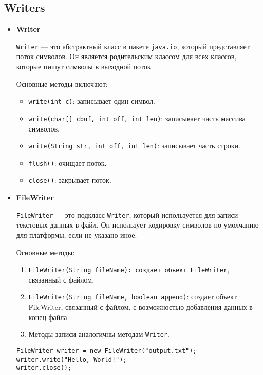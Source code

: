 \subsection{Writers}
\begin{itemize}
    \item \textbf{Writer} \par
    \texttt{Writer} — это абстрактный класс в пакете \texttt{java.io}, который представляет поток символов. Он является родительским классом для всех классов, которые пишут символы в выходной поток. \par
    Основные методы включают:
    \begin{itemize}
        
    \item \texttt{write(int c)}: записывает один символ.
    \item \texttt{write(char[] cbuf, int off, int len)}: записывает часть массива символов.
    \item \texttt{write(String str, int off, int len)}: записывает часть строки.
    \item \texttt{flush()}: очищает поток.
    \item \texttt{close()}: закрывает поток.
    \end{itemize}


    \item \textbf{FileWriter} \par
    \texttt{FileWriter} — это подкласс \texttt{Writer}, который используется для записи текстовых данных в файл. Он использует кодировку символов по умолчанию для платформы, если не указано иное. \par
    Основные методы:
    \begin{enumerate}
        \item \texttt{FileWriter(String fileName): создает объект FileWriter}, связанный с файлом.
        \item \texttt{FileWriter(String fileName, boolean append)}: создает объект FileWriter, связанный с файлом, с возможностью добавления данных в конец файла.
        \item Методы записи аналогичны методам \texttt{Writer}.
    \end{enumerate}
    \begin{verbatim}
FileWriter writer = new FileWriter("output.txt");
writer.write("Hello, World!");
writer.close();
    \end{verbatim}


\end{itemize}
